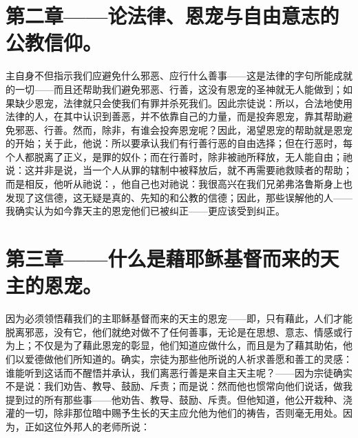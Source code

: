 
\section{第二章——论法律、恩宠与自由意志的公教信仰。}

主自身不但指示我们应避免什么邪恶、应行什么善事——这是法律的字句所能成就的一切——而且还帮助我们避免邪恶、行善，这没有恩宠的圣神就无人能做到；如果缺少恩宠，法律就只会使我们有罪并杀死我们。因此宗徒说：所以，合法地使用法律的人，在其中认识到善恶，并不依靠自己的力量，而是投奔恩宠，靠其帮助避免邪恶、行善。然而，除非，有谁会投奔恩宠呢？因此，渴望恩宠的帮助就是恩宠的开始；关于此，他说：所以要承认我们有行善行恶的自由选择；但在行恶时，每个人都脱离了正义，是罪的奴仆；而在行善时，除非被祂所释放，无人能自由；祂说：这并非是说，当一个人从罪的辖制中被释放后，就不再需要祂救赎者的帮助；而是相反，他听从祂说：，他自己也对祂说：我很高兴在我们兄弟弗洛鲁斯身上也发现了这信德，这无疑是真的、先知的和公教的信德；因此，那些误解他的人——我确实认为如今靠天主的恩宠他们已被纠正——更应该受到纠正。\par


\section{第三章——什么是藉耶稣基督而来的天主的恩宠。}

因为必须领悟藉我们的主耶稣基督而来的天主的恩宠——即，只有藉此，人们才能脱离邪恶，没有它，他们就绝对做不了任何善事，无论是在思想、意志、情感或行为上；不仅是为了藉此恩宠的彰显，他们知道应做什么，而且是为了藉其助佑，他们以爱德做他们所知道的。确实，宗徒为那些他所说的人祈求善愿和善工的灵感：谁能听到这话而不醒悟并承认，我们离恶行善是来自主天主呢？——因为宗徒确实不是说：我们劝告、教导、鼓励、斥责；而是说：然而他也惯常向他们说话，做我提到过的所有那些事——他劝告、教导、鼓励、斥责。但他知道，他公开栽种、浇灌的一切，除非那位暗中赐予生长的天主应允他为他们的祷告，否则毫无用处。因为，正如这位外邦人的老师所说：\par

